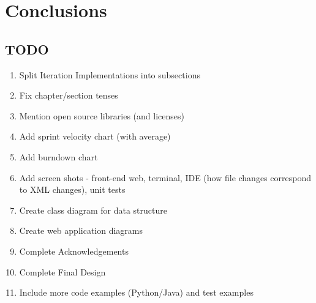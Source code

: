 \chapter{Conclusions}

\section{TODO}
\begin{enumerate}
\item Split Iteration Implementations into subsections
\item Fix chapter/section tenses
\item Mention open source libraries (and licenses)
\item Add sprint velocity chart (with average)
\item Add burndown chart
\item Add screen shots - front-end web, terminal, IDE (how file changes correspond to XML changes), unit tests
\item Create class diagram for data structure
\item Create web application diagrams
\item Complete Acknowledgements
\item Complete Final Design
\item Include more code examples (Python/Java) and test examples
\end{enumerate}
